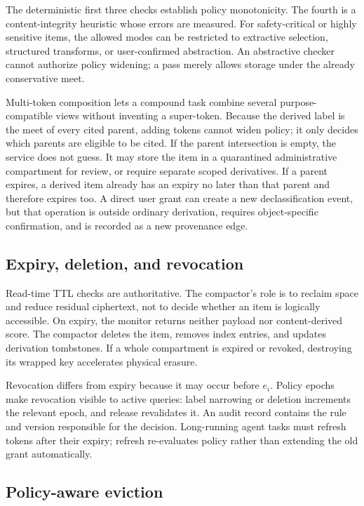 The deterministic first three checks establish policy monotonicity. The fourth is a content-integrity heuristic whose errors are measured. For safety-critical or highly sensitive items, the allowed modes can be restricted to extractive selection, structured transforms, or user-confirmed abstraction. An abstractive checker cannot authorize policy widening; a pass merely allows storage under the already conservative meet.

Multi-token composition lets a compound task combine several purpose-compatible views without inventing a super-token. Because the derived label is the meet of every cited parent, adding tokens cannot widen policy; it only decides which parents are eligible to be cited. If the parent intersection is empty, the service does not guess. It may store the item in a quarantined administrative compartment for review, or require separate scoped derivatives. If a parent expires, a derived item already has an expiry no later than that parent and therefore expires too. A direct user grant can create a new declassification event, but that operation is outside ordinary derivation, requires object-specific confirmation, and is recorded as a new provenance edge.

\subsection{Expiry, deletion, and revocation}

Read-time TTL checks are authoritative. The compactor's role is to reclaim space and reduce residual ciphertext, not to decide whether an item is logically accessible. On expiry, the monitor returns neither payload nor content-derived score. The compactor deletes the item, removes index entries, and updates derivation tombstones. If a whole compartment is expired or revoked, destroying its wrapped key accelerates physical erasure.

Revocation differs from expiry because it may occur before $e_i$. Policy epochs make revocation visible to active queries: label narrowing or deletion increments the relevant epoch, and release revalidates it. An audit record contains the rule and version responsible for the decision. Long-running agent tasks must refresh tokens after their expiry; refresh re-evaluates policy rather than extending the old grant automatically.

\subsection{Policy-aware eviction}

